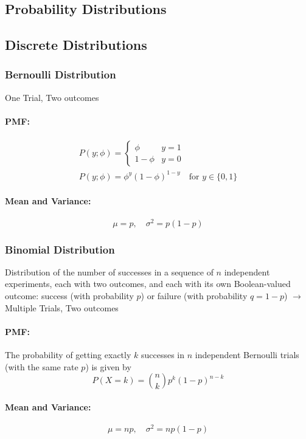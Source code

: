 \documentclass[8pt, a4paper, landscape, includeheadfoot]{extarticle}
\begin{document}
\begin{multicols*}{4}
	\section{Probability Distributions}

	\subsection{Discrete Distributions}

	\subsubsection{Bernoulli Distribution}{}
	One Trial, Two outcomes
	\paragraph{PMF:}
	\begin{align*}
		P(y;\phi) = \begin{cases}
			\phi     & y = 1 \\
			1 - \phi & y = 0
		\end{cases} \\
		P(y;\phi) = \phi^y (1-\phi)^{1-y} \quad \text{for } y \in \{0,1\}
	\end{align*}

	\paragraph{Mean and Variance:}
	$$
		\mu = p, \quad \sigma^2 = p(1 - p)
	$$

	\subsubsection{Binomial Distribution}{}
	Distribution of the number of successes in a sequence of $n$ independent experiments, each with two outcomes, and each with its own Boolean-valued outcome: success (with probability $p$) or failure (with probability $q = 1 -p$)
	$\rightarrow$ Multiple Trials, Two outcomes
	\paragraph{PMF:}
	The probability of getting exactly $k$ successes in $n$ independent Bernoulli trials (with the same rate $p$) is given by
	$$
		P(X = k) = \binom{n}{k} p^k (1-p)^{n-k}
	$$
	\paragraph{Mean and Variance:}
	$$
		\mu = np, \quad \sigma^2 = np(1 - p)
	$$


\end{multicols*}
\end{document}
